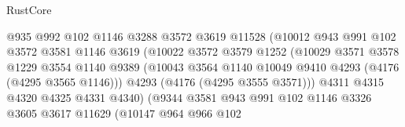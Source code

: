 \begin{lexlean}{RustCore}
\begin{coremodule}
                                    @935
                                    @992
                                    @102
                                    @1146
                                    @3288
                                    @3572
                                    @3619
                                    @11528
                                    (@10012
                                      @943
                                      @991
                                      @102
                                      @3572
                                      @3581
                                      @1146
                                      @3619
                                      (@10022
                                        @3572
                                        @3579
                                        @1252
                                        (@10029
                                          @3571
                                          @3578
                                          @1229
                                          @3554
                                          @1140
                                          @9389
                                          (@10043
                                            @3564
                                            @1140
                                            @10049
                                            @9410
                                            @4293
                                            (@4176 (@4295 @3565 @1146)))
                                          @4293
                                          (@4176 (@4295 @3555 @3571)))
                                        @4311
                                        @4315
                                        @4320
                                        @4325
                                        @4331
                                        @4340)
                                      (@9344
                                        @3581
                                        @943
                                        @991
                                        @102
                                        @1146
                                        @3326
                                        @3605
                                        @3617
                                        @11629
                                        (@10147
                                          @964
                                          @966
                                          @102

\end{coremodule}
\end{lexlean}
